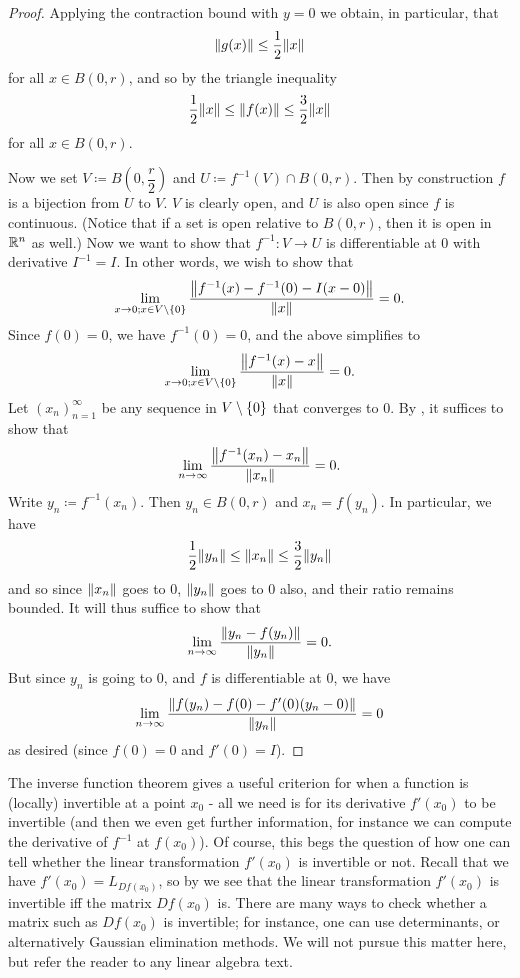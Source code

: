 \begin{proof}
  Applying the contraction bound with \(y = 0\) we obtain, in particular, that
  \[
    \norm*{g(x)} \leq \dfrac{1}{2} \norm*{x}
  \]
  for all \(x \in B(0, r)\), and so by the triangle inequality
  \[
    \dfrac{1}{2} \norm*{x} \leq \norm*{f(x)} \leq \dfrac{3}{2} \norm*{x}
  \]
  for all \(x \in B(0, r)\).

  Now we set \(V \coloneqq B(0, \dfrac{r}{2})\) and \(U \coloneqq f^{-1}(V) \cap B(0, r)\).
  Then by construction \(f\) is a bijection from \(U\) to \(V\).
  \(V\) is clearly open, and \(U\) is also open since \(f\) is continuous.
  (Notice that if a set is open relative to \(B(0, r)\), then it is open in \(\R^n\) as well.)
  Now we want to show that \(f^{-1} : V \to U\) is differentiable at \(0\) with derivative \(I^{-1} = I\).
  In other words, we wish to show that
  \[
    \lim_{x \to 0 ; x \in V \setminus \set{0}} \dfrac{\norm*{f^{-1}(x) - f^{-1}(0) - I(x - 0)}}{\norm*{x}} = 0.
  \]
  Since \(f(0) = 0\), we have \(f^{-1}(0) = 0\), and the above simplifies to
  \[
    \lim_{x \to 0 ; x \in V \setminus \set{0}} \dfrac{\norm*{f^{-1}(x) - x}}{\norm*{x}} = 0.
  \]
  Let \((x_n)_{n = 1}^\infty\) be any sequence in \(V \setminus \set{0}\) that converges to \(0\).
  By , it suffices to show that
  \[
    \lim_{n \to \infty} \dfrac{\norm*{f^{-1}(x_n) - x_n}}{\norm*{x_n}} = 0.
  \]
  Write \(y_n \coloneqq f^{-1}(x_n)\).
  Then \(y_n \in B(0, r)\) and \(x_n = f(y_n)\).
  In particular, we have
  \[
    \dfrac{1}{2} \norm*{y_n} \leq \norm*{x_n} \leq \dfrac{3}{2} \norm*{y_n}
  \]
  and so since \(\norm*{x_n}\) goes to \(0\), \(\norm*{y_n}\) goes to \(0\) also, and their ratio remains bounded.
  It will thus suffice to show that
  \[
    \lim_{n \to \infty} \dfrac{\norm*{y_n - f(y_n)}}{\norm*{y_n}} = 0.
  \]
  But since \(y_n\) is going to \(0\), and \(f\) is differentiable at \(0\), we have
  \[
    \lim_{n \to \infty} \dfrac{\norm*{f(y_n) - f(0) - f'(0)(y_n - 0)}}{\norm*{y_n}} = 0
  \]
  as desired (since \(f(0) = 0\) and \(f'(0) = I\)).
\end{proof}

\begin{note}
  The inverse function theorem gives a useful criterion for when a function is (locally) invertible at a point \(x_0\)
  - all we need is for its derivative \(f'(x_0)\) to be invertible
  (and then we even get further information, for instance we can compute the derivative of \(f^{-1}\) at \(f(x_0)\)).
  Of course, this begs the question of how one can tell whether the linear transformation \(f'(x_0)\) is invertible or not.
  Recall that we have \(f'(x_0) = L_{D f(x_0)}\), so by  we see that the linear transformation \(f'(x_0)\) is invertible iff the matrix \(D f(x_0)\) is.
  There are many ways to check whether a matrix such as \(D f(x_0)\) is invertible;
  for instance, one can use determinants, or alternatively Gaussian elimination methods.
  We will not pursue this matter here, but refer the reader to any linear algebra text.
\end{note}

